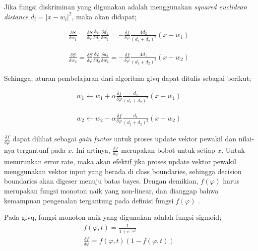 \noindent Jika fungsi diskriminan yang digunakan adalah menggunakan
\textit{squared euclidean distance} $d_i = \lvert x - w_i\rvert ^2$,  maka akan
didapat;

\begin{align}
\label{eq:turunan1a}
	\frac{\delta S}{\delta w_1} =  
	\frac{\delta S}{\delta \varphi} \frac{\delta \varphi}{\delta d_1} \frac{\delta
	d_1}{\delta w_1} =
	- \frac{\delta f}{\delta \varphi} \frac{4d_2}{(d_1 + d_2)^2} (x - w_1)
\end{align}

\begin{align}
\label{eq:turunan1b}
	\frac{\delta S}{\delta w_2} =  
	\frac{\delta S}{\delta \varphi} \frac{\delta \varphi}{\delta d_2} \frac{\delta
	d_2}{\delta w_2} =
	- \frac{\delta f}{\delta \varphi} \frac{4d_1}{(d_1 + d_2)^2} (x - w_2)
\end{align}

\noindent Sehingga, aturan pembelajaran dari algoritma \gls{glvq} dapat ditulis
sebagai berikut;

\begin{align}
\label{eq:glvq-rulea}
	w_1 \leftarrow w_1 + \alpha   
	\frac{\delta f}{\delta \varphi} \frac{d_2}{(d_1 + d_2)^2} (x - w_1)
\end{align}

\begin{align}
\label{eq:glvq-ruleb}
	w_2 \leftarrow w_2 - \alpha   
	\frac{\delta f}{\delta \varphi} \frac{d_1}{(d_1 + d_2)^2} (x - w_2)
\end{align}

$\frac{\delta f}{\delta \varphi}$ dapat dilihat sebagai \emph{gain factor} untuk
proses update vektor pewakil dan nilai-nya tergantunf pada $x$. Ini artinya, 
$\frac{\delta f}{\delta \varphi}$ merupakan bobot untuk setiap $x$. Untuk
menurunkan error rate, maka akan efektif jika proses update vektor pewakil
menggunakan vektor input yang berada di class boundaries, sehingga decision
boundaries akan digeser menuju batas bayes. Dengan demikian, $f(\varphi)$ harus
merupakan fungsi monoton naik yang non-linear, dan dianggap bahwa kemampuan
pengenalan tergantung pada definisi fungsi $f(\varphi)$ .

Pada \gls{glvq}, fungsi monoton naik yang digunakan adalah fungsi sigmoid;
\begin{align}
\label{eq:sigmoid}
	f(\varphi, t) = \frac{1}{1 + e^{-\varphi t}} \\
\label{eq:deltasigmoid}
	\frac{\delta f}{\delta \varphi} = f(\varphi, t) (1 - f(\varphi , t))
\end{align} 

